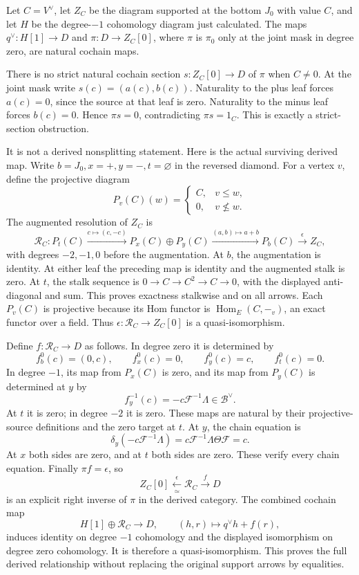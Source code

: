 \documentclass[
  11pt,
]{article}
\begin{document}
Let \(C=V^\vee\), let \(Z_C\) be the diagram supported at the bottom
\(J_0\) with value \(C\), and let \(H\) be the degree-\(-1\) cohomology
diagram just calculated. The maps \(q^\vee:H[1]\to D\) and
\(\pi:D\to Z_C[0]\), where \(\pi\) is \(\pi_0\) only at the joint mask
in degree zero, are natural cochain maps.

There is no strict natural cochain section \(s:Z_C[0]\to D\) of \(\pi\)
when \(C\ne0\). At the joint mask write \(s(c)=(a(c),b(c))\). Naturality
to the plus leaf forces \(a(c)=0\), since the source at that leaf is
zero. Naturality to the minus leaf forces \(b(c)=0\). Hence \(\pi s=0\),
contradicting \(\pi s=1_C\). This is exactly a strict-section
obstruction.

It is not a derived nonsplitting statement. Here is the actual surviving
derived map. Write \(b=J_0,x=+,y=-,t=\varnothing\) in the reversed
diamond. For a vertex \(v\), define the projective diagram \[
P_v(C)(w)=\begin{cases}C,&v\le w,\\0,&v\nleq w.\end{cases}
\] The augmented resolution of \(Z_C\) is \[
\mathcal R_C:
P_t(C)\xrightarrow{c\mapsto(c,-c)}
P_x(C)\oplus P_y(C)\xrightarrow{(a,b)\mapsto a+b}
P_b(C)\xrightarrow{\epsilon}Z_C,
\] with degrees \(-2,-1,0\) before the augmentation. At \(b\), the
augmentation is identity. At either leaf the preceding map is identity
and the augmented stalk is zero. At \(t\), the stalk sequence is
\(0\to C\to C^2\to C\to0\), with the displayed anti-diagonal and sum.
This proves exactness stalkwise and on all arrows. Each \(P_v(C)\) is
projective because its Hom functor is \(\operatorname{Hom}_E(C,-_v)\),
an exact functor over a field. Thus \(\epsilon:\mathcal R_C\to Z_C[0]\)
is a quasi-isomorphism.

Define \(f:\mathcal R_C\to D\) as follows. In degree zero it is
determined by \[
f_b^0(c)=(0,c),\qquad f_x^0(c)=0,\qquad f_y^0(c)=c,\qquad f_t^0(c)=0.
\] In degree \(-1\), its map from \(P_x(C)\) is zero, and its map from
\(P_y(C)\) is determined at \(y\) by \[
f_y^{-1}(c)=-c\mathcal F^{-1}\Lambda\in\mathscr B^\vee.
\] At \(t\) it is zero; in degree \(-2\) it is zero. These maps are
natural by their projective-source definitions and the zero target at
\(t\). At \(y\), the chain equation is \[
\delta_y(-c\mathcal F^{-1}\Lambda)
=c\mathcal F^{-1}\Lambda\Theta\mathcal F=c.
\] At \(x\) both sides are zero, and at \(t\) both sides are zero. These
verify every chain equation. Finally \(\pi f=\epsilon\), so \[
Z_C[0]\xleftarrow[\simeq]{\epsilon}\mathcal R_C\xrightarrow{f}D
\] is an explicit right inverse of \(\pi\) in the derived category. The
combined cochain map \[
H[1]\oplus\mathcal R_C\longrightarrow D,
\qquad(h,r)\longmapsto q^\vee h+f(r),
\] induces identity on degree \(-1\) cohomology and the displayed
isomorphism on degree zero cohomology. It is therefore a
quasi-isomorphism. This proves the full derived relationship without
replacing the original support arrows by equalities.
\end{document}
